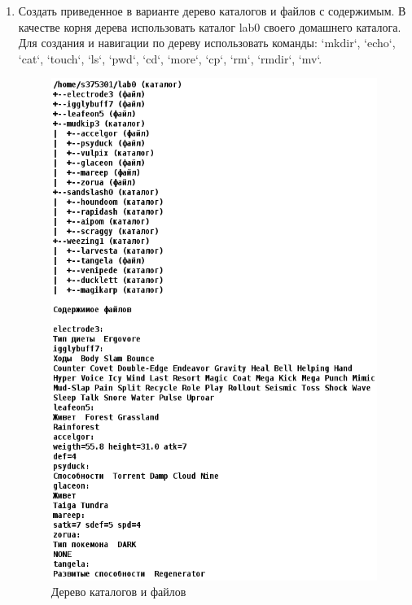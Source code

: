     \begin{enumerate}
        \item Создать приведенное в варианте дерево каталогов и файлов с содержимым. В качестве корня дерева использовать каталог lab0 своего домашнего каталога. Для создания и навигации по дереву использовать команды: `mkdir`, `echo`, `cat`, `touch`, `ls`, `pwd`, `cd`, `more`, `cp`, `rm`, `rmdir`, `mv`.
        \begin{figure}[H] %
            \centering
            \includegraphics[width=\textwidth]{res/tree}
            \caption{Дерево каталогов и файлов}
            \label{fig:enter-label}
        \end{figure}


\end{enumerate}
